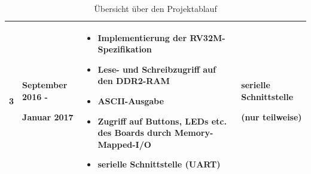 \begin{table}[H]
\begin{tabular}{|p{45pt}|p{80pt}|p{220pt}|p{115pt}|}
\begin{description}[noitemsep,topsep=0pt]
\item 3
\end{description}                        & \begin{description}[noitemsep,topsep=0pt]
                                           \item September 2016 -
                                           \item Januar 2017
                                           \end{description}                        & \begin{itemize}[noitemsep,topsep=0pt]
                                                                                      \item Implementierung der RV32M-Spezifikation
                                                                                      \item Lese- und Schreibzugriff auf den DDR2-RAM
                                                                                      \item ASCII-Ausgabe
                                                                                      \item Zugriff auf Buttons, LEDs etc. des Boards durch Memory-Mapped-I/O
                                                                                      \item serielle Schnittstelle (UART)
                                                                                      \end{itemize}                                                              & \begin{description}[noitemsep,topsep=0pt]
                                                                                                                                                                   \item serielle Schnittstelle
                                                                                                                                                                   \item (nur teilweise)
                                                                                                                                                                   \end{description}                        \\

\hline
\end{tabular}
\caption{\"Ubersicht \"uber den Projektablauf}
\end{table}

